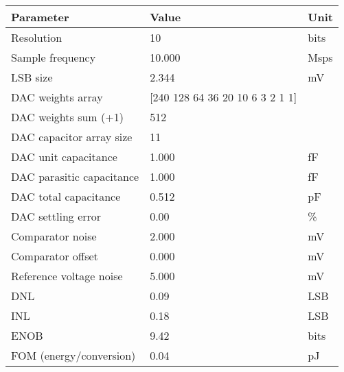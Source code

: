 \begin{tabular}{lll}
\toprule
Parameter & Value & Unit \\
\midrule
Resolution & 10 & bits \\
Sample frequency & 10.000 & Msps \\
LSB size & 2.344 & mV \\
DAC weights array & [240 128  64  36  20  10   6   3   2   1   1] &  \\
DAC weights sum (+1) & 512 &  \\
DAC capacitor array size & 11 &  \\
DAC unit capacitance & 1.000 & fF \\
DAC parasitic capacitance & 1.000 & fF \\
DAC total capacitance & 0.512 & pF \\
DAC settling error & 0.00 & \% \\
Comparator noise & 2.000 & mV \\
Comparator offset & 0.000 & mV \\
Reference voltage noise & 5.000 & mV \\
DNL & 0.09 & LSB \\
INL & 0.18 & LSB \\
ENOB & 9.42 & bits \\
FOM (energy/conversion) & 0.04 & pJ \\
\bottomrule
\end{tabular}
